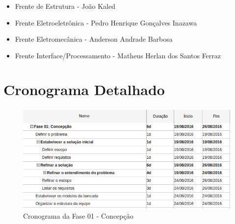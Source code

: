 \begin{apendicesenv}
\begin{itemize}
	\item Frente de Estrutura - João Kaled\\
	\item Frente Eletroeletrônica - Pedro Henrique Gonçalves Inazawa\\
	\item Frente Eletromecânica - Anderson Andrade Barbosa\\
	\item Frente Interface/Processamento - Matheus Herlan dos Santos Ferraz\\
\end{itemize}


\chapter{Cronograma Detalhado}
	\label{cronograma_detalhado}
%     


\begin{figure}[!ht]
\centering
\includegraphics[scale=1]{figuras/cronograma_fase01.png}
\caption{Cronograma da Fase 01 - Concepção}
\end{figure}


\end{apendicesenv}
